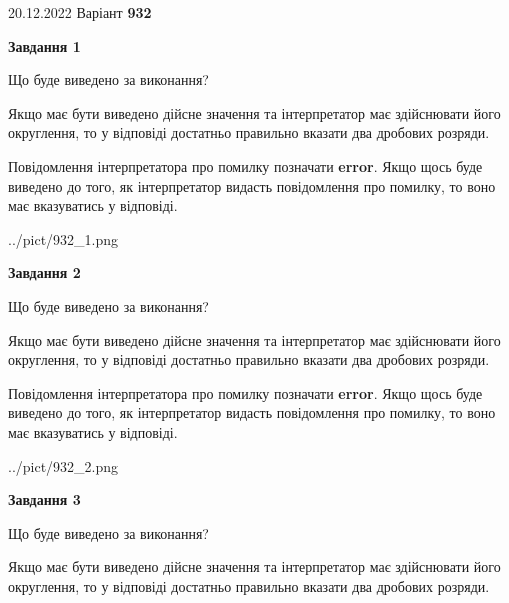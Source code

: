 \documentclass[12pt, ukrainian]{article}
\begin{document}
{20.12.2022 Варіант \No \textbf { 932 }\par}
{
\begin {Large}

{\begin {center}\textbf{Завдання 1}\end {center}}\par
Що буде виведено за виконання? \par

Якщо має бути виведено дійсне значення та інтерпретатор має здійснювати його округлення, 
то у відповіді достатньо правильно вказати два дробових розряди.

Повідомлення інтерпретатора про помилку позначати \textbf{error}.
Якщо щось буде виведено до того, як інтерпретатор видасть повідомлення про помилку, 
то воно має вказуватись у відповіді. \par

\begin{center}
	{../pict/932_1.png}
\end{center}
\newpage

{\begin {center}\textbf{Завдання 2}\end {center}}\par
Що буде виведено за виконання? \par

Якщо має бути виведено дійсне значення та інтерпретатор має здійснювати його округлення, 
то у відповіді достатньо правильно вказати два дробових розряди.

Повідомлення інтерпретатора про помилку позначати \textbf{error}.
Якщо щось буде виведено до того, як інтерпретатор видасть повідомлення про помилку, 
то воно має вказуватись у відповіді. \par

\begin{center}
	{../pict/932_2.png}
\end{center}
\newpage

{\begin {center}\textbf{Завдання 3}\end {center}}\par
Що буде виведено за виконання? \par

Якщо має бути виведено дійсне значення та інтерпретатор має здійснювати його округлення, 
то у відповіді достатньо правильно вказати два дробових розряди.


\end{Large}}
\end{document}
